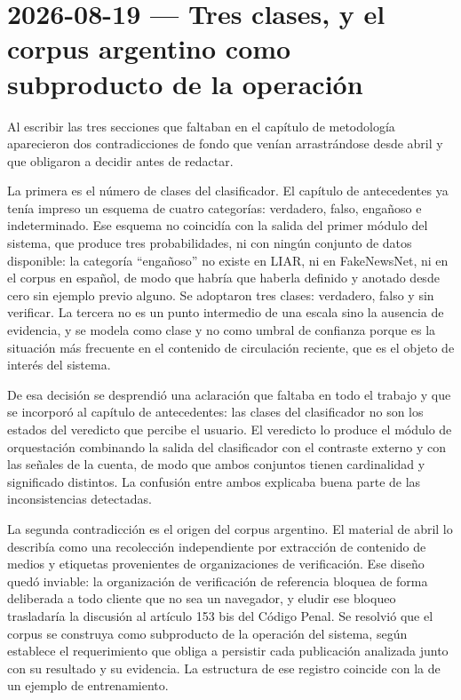 \section{2026-08-19 — Tres clases, y el corpus argentino como subproducto de la operación}

Al escribir las tres secciones que faltaban en el capítulo de metodología aparecieron dos contradicciones de fondo que venían arrastrándose desde abril y que obligaron a decidir antes de redactar.

La primera es el número de clases del clasificador. El capítulo de antecedentes ya tenía impreso un esquema de cuatro categorías: verdadero, falso, engañoso e indeterminado. Ese esquema no coincidía con la salida del primer módulo del sistema, que produce tres probabilidades, ni con ningún conjunto de datos disponible: la categoría \enquote{engañoso} no existe en LIAR, ni en FakeNewsNet, ni en el corpus en español, de modo que habría que haberla definido y anotado desde cero sin ejemplo previo alguno. Se adoptaron tres clases: verdadero, falso y sin verificar. La tercera no es un punto intermedio de una escala sino la ausencia de evidencia, y se modela como clase y no como umbral de confianza porque es la situación más frecuente en el contenido de circulación reciente, que es el objeto de interés del sistema.

De esa decisión se desprendió una aclaración que faltaba en todo el trabajo y que se incorporó al capítulo de antecedentes: las clases del clasificador no son los estados del veredicto que percibe el usuario. El veredicto lo produce el módulo de orquestación combinando la salida del clasificador con el contraste externo y con las señales de la cuenta, de modo que ambos conjuntos tienen cardinalidad y significado distintos. La confusión entre ambos explicaba buena parte de las inconsistencias detectadas.

La segunda contradicción es el origen del corpus argentino. El material de abril lo describía como una recolección independiente por extracción de contenido de medios y etiquetas provenientes de organizaciones de verificación. Ese diseño quedó inviable: la organización de verificación de referencia bloquea de forma deliberada a todo cliente que no sea un navegador, y eludir ese bloqueo trasladaría la discusión al artículo 153 bis del Código Penal. Se resolvió que el corpus se construya como subproducto de la operación del sistema, según establece el requerimiento que obliga a persistir cada publicación analizada junto con su resultado y su evidencia. La estructura de ese registro coincide con la de un ejemplo de entrenamiento.

